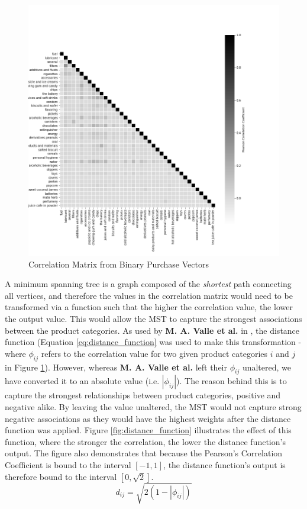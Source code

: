 \documentclass[paper=a4,fontsize=11pt]{report}	%
\begin{document}
\begin{figure}[H]
\centering
\includegraphics[scale=0.4]{correlation}
\caption{Correlation Matrix from Binary Purchase Vectors}
\label{fig:correlation}
\end{figure}

A minimum spanning tree is a graph composed of the \textit{shortest} path connecting all vertices, and therefore the values in the correlation matrix would need to be transformed via a function such that the higher the correlation value, the lower the output value. This would allow the MST to capture the strongest associations between the product categories. As used by \textbf{M. A. Valle et al.} in \cite{mst_paper}, the distance function (Equation \ref{eq:distance_function}  was used to make this transformation - where $\phi_{ij}$ refers to the correlation value for two given product categories $i$ and $j$ in Figure \ref{fig:correlation}). However, whereas \textbf{M. A. Valle et al.} left their $\phi_{ij}$ unaltered, we have converted it to an absolute value (i.e. $|\phi_{ij}|$). The reason behind this is to capture the strongest relationships between product categories, positive and negative alike. By leaving the value unaltered, the MST would not capture strong negative associations as they would have the highest weights after the distance function was applied. Figure \ref{fig:distance_function} illustrates the effect of this function, where the stronger the correlation, the lower the distance function's output. The figure also demonstrates that because the Pearson's Correlation Coefficient is bound to the interval $[-1,1]$, the distance function's output is therefore bound to the interval $[0,\sqrt{2}]$. 
\begin{equation}
\label{eq:distance_function}
d_{ij} = \sqrt{2(1-|\phi_{ij}|)}
\end{equation}
\end{document}

